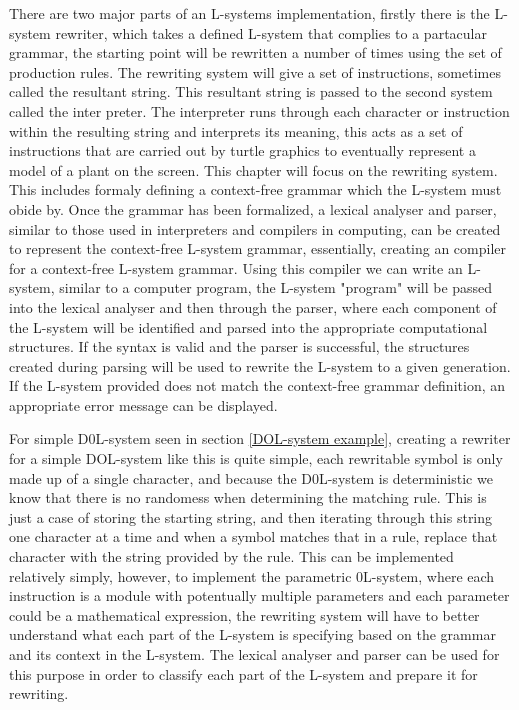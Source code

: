 
\begin{flushleft}

There are two major parts of an L-systems implementation, firstly there is the L-system rewriter, which takes a defined L-system that complies to a partacular grammar, the starting point will be rewritten a number of times using the set of production rules. The rewriting system will give a set of instructions, sometimes called the resultant string. This resultant string is passed to the second system called the inter
preter. The interpreter runs through each character or instruction within the resulting string  and interprets its meaning, this acts as a set of instructions that are carried out by turtle graphics to eventually represent a model of a plant on the screen. This chapter will focus on the rewriting system. This includes formaly defining a context-free grammar which the L-system must obide by. Once the grammar has been formalized, a lexical analyser and parser, similar to those used in interpreters and compilers in computing, can be created to represent the context-free L-system grammar, essentially, creating an compiler for a context-free L-system grammar. Using this compiler we can write an L-system, similar to a computer program, the L-system "program" will be passed into the lexical analyser and then through the parser, where each component of the L-system will be identified and parsed into the appropriate computational structures. If the syntax is valid and the parser is successful, the structures created during parsing will be used to rewrite the L-system to a given generation. If the L-system provided does not match the context-free grammar definition, an appropriate error message can be displayed. \\

\vspace{5mm}

For simple D0L-system seen in section \ref{DOL-system example}, creating a rewriter for a simple DOL-system like this is quite simple, each rewritable symbol is only made up of a single character, and because the D0L-system is deterministic we know that there is no randomess when determining the matching rule. This is just a case of storing the starting string, and then iterating through this string one character at a time and when a symbol matches that in a rule, replace that character with the string provided by the rule. This can be implemented relatively simply, however, to implement the parametric 0L-system, where each instruction is a module with potentually multiple parameters and each parameter could be a mathematical expression, the rewriting system will have to better understand what each part of the L-system is specifying based on the grammar and its context in the L-system. The lexical analyser and parser can be used for this purpose in order to classify each part of the L-system and prepare it for rewriting. \\


\end{flushleft}
